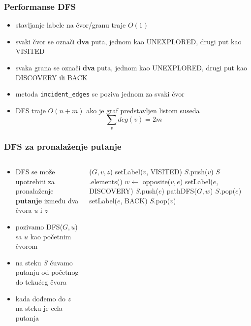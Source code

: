 \documentclass[compress]{beamer}
\begin{document}
\begin{frame}[fragile]
  \frametitle{Performanse DFS}
  \begin{itemize}
    \item stavljanje labele na čvor/granu traje $O(1)$
    \item svaki čvor se označi \textbf{dva} puta, jednom kao {\scriptsize 
      UNEXPLORED}, drugi put kao {\scriptsize VISITED}
    \item svaka grana se označi \textbf{dva} puta, jednom kao {\scriptsize 
      UNEXPLORED}, drugi put kao {\scriptsize DISCOVERY} ili 
      {\scriptsize BACK}
    \item metoda \texttt{incident\_edges} se poziva jednom za svaki čvor
    \item DFS traje $O(n+m)$ ako je graf predstavljen listom suseda
    $$\sum_{v}deg(v)=2m$$
  \end{itemize}
\end{frame}

\begin{frame}[fragile]
  \frametitle{DFS za pronalaženje putanje}
  {\footnotesize
  \begin{columns}
    \begin{column}[t]{6cm}
      \begin{itemize}
        \item DFS se može upotrebiti za pronalaženje \textbf{putanje} 
          između dva čvora $u$ i $z$
        \item pozivamo DFS($G,u$) sa $u$ kao početnim čvorom
        \item na steku $S$ čuvamo putanju od početnog do tekućeg čvora
        \item kada dođemo do $z$ na steku je cela putanja
      \end{itemize}
    \end{column}
    \begin{column}[t]{6cm}
      \begin{algorithmic}
        \STATE {}($G,v,z$)
        \STATE setLabel($v$, {\scriptsize VISITED})
        \STATE $S$.push($v$)
          \RETURN $S$.elements()
        \ENDIF
            \STATE $w \leftarrow$ opposite($v,e$)
              \STATE setLabel($e$, {\scriptsize DISCOVERY})
              \STATE $S$.push($e$)
              \STATE pathDFS($G, w$)
              \STATE $S$.pop($e$)
            \ELSE
              \STATE setLabel($e$, {\scriptsize BACK})
            \ENDIF
          \ENDIF
        \ENDFOR
        \STATE $S$.pop($v$)
      \end{algorithmic}
    \end{column}
  \end{columns}
  }
\end{frame}
\end{document}
